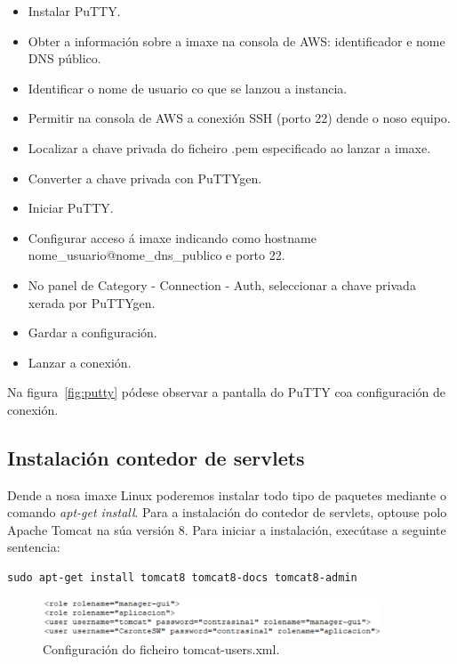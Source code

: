 \begin{itemize}
	\item Instalar PuTTY.
	\item Obter a información sobre a imaxe na consola de AWS: identificador e nome DNS público.
	\item Identificar o nome de usuario co que se lanzou a instancia.
	\item Permitir na consola de AWS a conexión SSH (porto 22) dende o noso equipo.
	\item Localizar a chave privada do ficheiro .pem especificado ao lanzar a imaxe.
	\item Converter a chave privada con PuTTYgen.
	\item Iniciar PuTTY.
	\item Configurar acceso á imaxe indicando como hostname nome\_usuario@nome\_dns\_publico e porto 22.
	\item No panel de Category - Connection - Auth, seleccionar a chave privada xerada por PuTTYgen.
	\item Gardar a configuración.
	\item Lanzar a conexión.
\end{itemize}

Na figura~\ref{fig:putty} pódese observar a pantalla do PuTTY coa configuración de conexión.

\subsection{Instalación contedor de servlets}
Dende a nosa imaxe Linux poderemos instalar todo tipo de paquetes mediante o comando \emph{apt-get install}. Para a instalación do contedor de servlets, optouse polo Apache Tomcat na súa versión 8. Para iniciar a instalación, execútase a seguinte sentencia:

\begin{lstlisting}
sudo apt-get install tomcat8 tomcat8-docs tomcat8-admin
\end{lstlisting}

\begin{figure}[h]
	\begin{center}
		\includegraphics[width=0.9\textwidth]{figures/capturas/tomcatUsers}
		\caption{Configuración do ficheiro tomcat-users.xml.}
		\label{fig:tomcatUsers}
	\end{center}
\end{figure}

